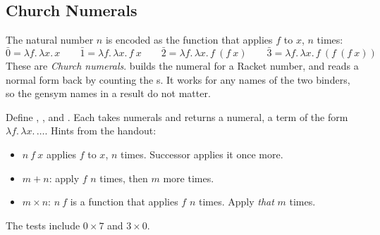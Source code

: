 \subsection{Church Numerals}

The natural number $n$ is encoded as the function that applies $f$ to $x$, $n$ times:
\[
\bar 0 = \lambda f.\, \lambda x.\, x \qquad
\bar 1 = \lambda f.\, \lambda x.\, f\ x \qquad
\bar 2 = \lambda f.\, \lambda x.\, f\ (f\ x) \qquad
\bar 3 = \lambda f.\, \lambda x.\, f\ (f\ (f\ x))
\]
These are \emph{Church numerals}.  builds the numeral for a Racket number, and  reads a normal form back by counting the s. It works for any names of the two binders, so the gensym names in a result do not matter.

\begin{exercise}[Arithmetic]
Define , , and . Each takes numerals and returns a numeral, a term of the form $\lambda f.\, \lambda x.\, \dots$. Hints from the handout:
\begin{itemize}
  \item $n\ f\ x$ applies $f$ to $x$, $n$ times. Successor applies it once more.
  \item $m + n$: apply $f$ $n$ times, then $m$ more times.
  \item $m \times n$: $n\ f$ is a function that applies $f$ $n$ times. Apply \emph{that} $m$ times.
\end{itemize}
The tests include $0 \times 7$ and $3 \times 0$.
\end{exercise}
